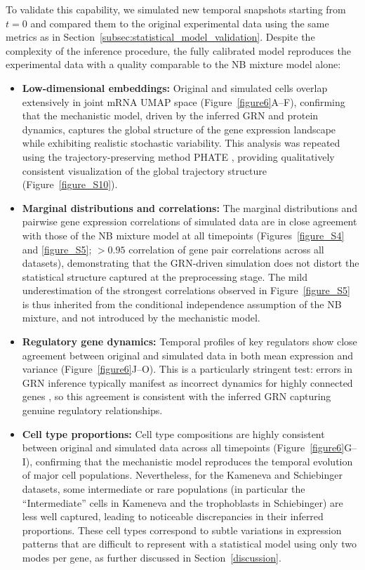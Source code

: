 \documentclass[a4paper, 11pt]{article}
\theoremstyle{plain}
\theoremstyle{remark}
\newcommand*{\firstreview}[1]{{\color{black}#1}}
\begin{document}
To validate this capability, we simulated new temporal snapshots starting from 
$t=0$ and compared them to the original experimental data using the same metrics 
as in Section~\ref{subsec:statistical_model_validation}. Despite the 
complexity of the inference procedure, the fully calibrated model reproduces the 
experimental data with a quality comparable to the NB mixture model alone:
\begin{itemize}
\item \textbf{Low-dimensional embeddings:} Original and simulated cells overlap 
extensively in joint mRNA UMAP space (Figure~\ref{figure6}A--F), confirming that the 
mechanistic model, driven by the inferred GRN and protein dynamics, 
captures the global structure of the gene expression landscape while 
exhibiting realistic stochastic variability. \firstreview{This analysis was repeated using the trajectory-preserving method PHATE \cite{Moon2019}, providing qualitatively consistent visualization of the global trajectory structure (Figure~\ref{figure_S10}).}

\item \textbf{Marginal distributions and correlations:} The marginal distributions and 
pairwise gene expression correlations of simulated data are in close agreement 
with those of the NB mixture model at all timepoints (Figures~\ref{figure_S4} and 
\ref{figure_S5}; $>0.95$ correlation of gene pair correlations across all datasets), 
demonstrating that the GRN-driven simulation does not distort the statistical 
structure captured at the preprocessing stage. The mild underestimation of the 
strongest correlations observed in Figure~\ref{figure_S5} is thus inherited from 
the conditional independence assumption of the NB mixture, and not introduced 
by the mechanistic model.

\item \textbf{Regulatory gene dynamics:} Temporal profiles of key regulators show 
close agreement between original and simulated data in both mean expression 
and variance (Figure~\ref{figure6}J--O). This is a particularly stringent test: 
errors in GRN inference typically manifest as incorrect dynamics for highly 
connected genes \cite{ventre2023one}, so this agreement is consistent with the inferred GRN capturing genuine regulatory relationships.

\item \textbf{Cell type proportions:} Cell type compositions are highly consistent between original and simulated data across all timepoints (Figure~\ref{figure6}G--I), confirming that the mechanistic model reproduces the temporal evolution of major cell populations. Nevertheless, for the Kameneva and Schiebinger datasets, some intermediate or rare populations (in particular the “Intermediate” cells in Kameneva and the trophoblasts in Schiebinger) are less well captured, leading to noticeable discrepancies in their inferred proportions. These cell types correspond to subtle variations in expression patterns that are difficult to represent with a statistical model using only two modes per gene, as further discussed in Section~\ref{discussion}.


\end{itemize}
\end{document}
